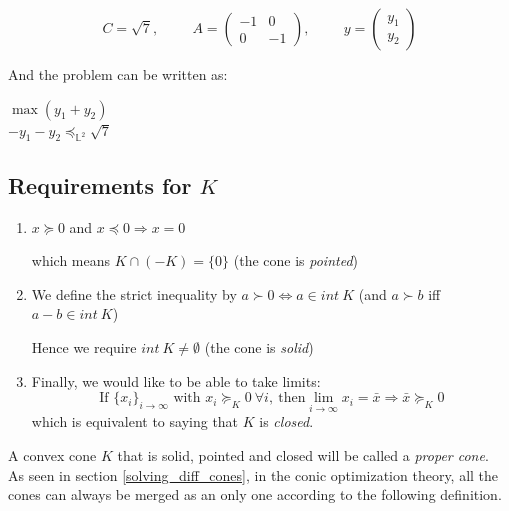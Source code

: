 \begin{example}
\begin{leftbar}
\begin{center}
\[
C =\sqrt7, 
\hspace{1cm}
A = \left( \begin{array}{cc}
-1 & 0 \\
0 & -1 \end{array} \right), 
\hspace{1cm}
y = \left( \begin{array}{c}
y_1 \\
y_2 \end{array} \right)
\]
\end{center}
And the problem can be written as: 
\begin{center}
$\max (y_1+y_2)$ \\
$-y_1-y_2 \preceq_{\mathbb{L}^2} \sqrt7$
\end{center}
\end{leftbar}
\end{example}

\subsection{Requirements for $K$} 
\begin{enumerate}
\item $x \succeq 0$ and $x \preceq 0 \Rightarrow x = 0$

which means $K \cap (-K) = \{ 0 \}$ (the cone is \emph{pointed})

\item We define the strict inequality by $a \succ 0
\Leftrightarrow a \in int ~K$ (and $a \succ b$ iff $a-b \in int~
K$)

Hence we require $int~ K \neq \emptyset$ (the cone is
\emph{solid})

\item Finally, we would like to be able to take limits:
\[ \text{If } \{ x_i \}_{i \to \infty} \text{ with } x_i \succeq_K
0 \ \forall i,\ \text{then} \lim_{i \to \infty} x_i = \bar{x}
\Rightarrow \bar{x} \succeq_K 0 \] which is equivalent to saying
that $K$ is \emph{closed}. \end{enumerate} 


A convex cone $K$ that is solid, pointed and closed will be called a \emph{proper cone}.\\

As seen in section \ref{solving_diff_cones}, in the conic optimization theory, all the cones can always be merged as an only one according to the following definition.\\

